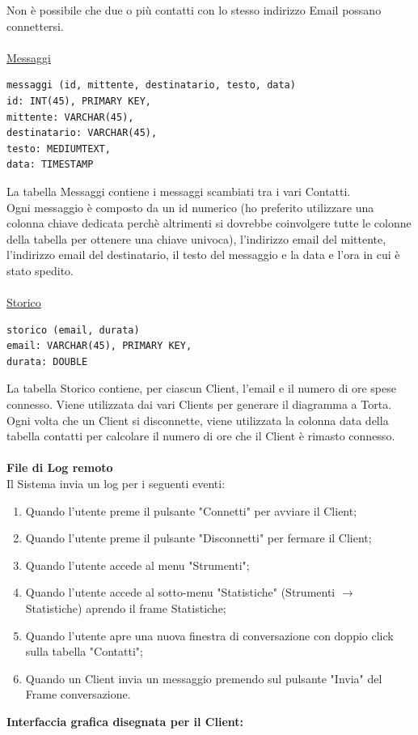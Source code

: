 \documentclass[a4paper, 11pt]{article} %
\begin{document}
Non \`e possibile che due o pi\`u contatti con lo stesso indirizzo Email possano connettersi.\\
\\
\underline{Messaggi}
\lstset{language=sql}
\begin{lstlisting}[frame=single]
messaggi (id, mittente, destinatario, testo, data)
id: INT(45), PRIMARY KEY,
mittente: VARCHAR(45),
destinatario: VARCHAR(45),
testo: MEDIUMTEXT,
data: TIMESTAMP
\end{lstlisting}
La tabella Messaggi contiene i messaggi scambiati tra i vari Contatti.\\
Ogni messaggio \`e composto da un id numerico (ho preferito utilizzare una colonna chiave dedicata perch\`e altrimenti si dovrebbe coinvolgere tutte le colonne della tabella per ottenere una chiave univoca), l'indirizzo email del mittente, l'indirizzo email del destinatario, il testo del messaggio e la data e l'ora in cui \`e stato spedito.\\
\\
\underline{Storico}
\lstset{language=sql}
\begin{lstlisting}[frame=single]
storico (email, durata)
email: VARCHAR(45), PRIMARY KEY,
durata: DOUBLE
\end{lstlisting}
La tabella Storico contiene, per ciascun Client, l'email e il numero di ore spese connesso.
Viene utilizzata dai vari Clients per generare il diagramma a Torta.\\
Ogni volta che un Client si disconnette, viene utilizzata la colonna data della tabella contatti per calcolare il numero di ore che il Client \`e rimasto connesso.\\
\\
\textbf{File di Log remoto}\\
Il Sistema invia un log per i seguenti eventi:
\begin{enumerate}
\item Quando l'utente preme il pulsante "Connetti" per avviare il Client;
\item Quando l'utente preme il pulsante "Disconnetti" per fermare il Client;
\item Quando l'utente accede al menu "Strumenti";
\item Quando l'utente accede al sotto-menu "Statistiche" (Strumenti $\rightarrow$ Statistiche) aprendo il frame Statistiche;
\item Quando l'utente apre una nuova finestra di conversazione con doppio click sulla tabella "Contatti";
\item Quando un Client invia un messaggio premendo sul pulsante "Invia" del Frame conversazione.
\end{enumerate}
\vspace{0.5cm}
\textbf{Interfaccia grafica disegnata per il Client:}
\end{document}
